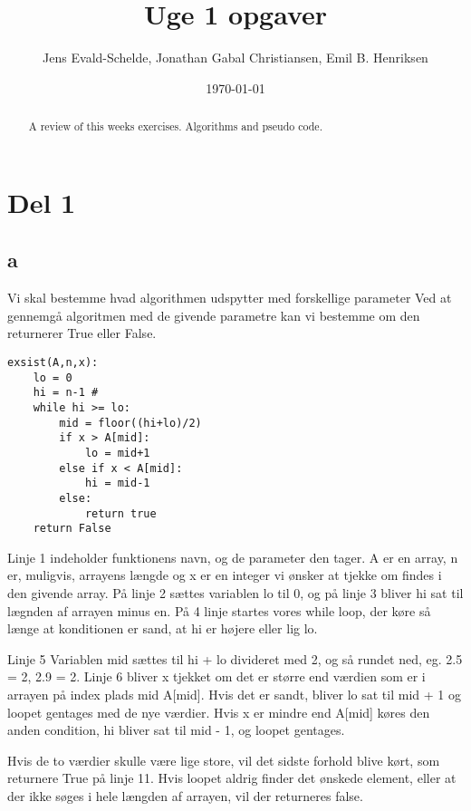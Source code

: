 \documentclass{report}
\begin{document}
\title{Uge 1 opgaver}
\author{Jens Evald-Schelde, Jonathan Gabal Christiansen, Emil B. Henriksen}
\date{\today}
\maketitle

\begin{abstract}
	A review of this weeks exercises. Algorithms and pseudo code.
\end{abstract}

\chapter{Del 1}
\section{a}
Vi skal bestemme hvad algorithmen udspytter med forskellige parameter\newline
Ved at gennemgå algoritmen med de givende parametre kan vi bestemme om den returnerer True eller False.

\lstset{language=Python,numbers=left,stepnumber=1}
\begin{lstlisting}[frame=single]
exsist(A,n,x):
	lo = 0 
	hi = n-1 # 
	while hi >= lo:
		mid = floor((hi+lo)/2)
		if x > A[mid]:  
			lo = mid+1
		else if x < A[mid]:
			hi = mid-1
		else:
			return true
	return False
\end{lstlisting}

Linje 1 indeholder funktionens navn, og de parameter den tager. A er en array, n er, muligvis, arrayens længde og x er en integer vi ønsker at tjekke om findes i den givende array. På linje 2 sættes variablen lo til 0, og på linje 3 bliver hi sat til lægnden af arrayen minus en. På 4 linje startes vores while loop, der køre så længe at konditionen er sand, at hi er højere eller lig lo.
\newline

Linje 5 Variablen mid sættes til hi + lo divideret med 2, og så rundet ned, eg. 2.5 = 2, 2.9 = 2. Linje 6 bliver x tjekket om det er større end værdien som er i arrayen på index plads mid A[mid]. Hvis det er sandt, bliver lo sat til mid + 1 og loopet gentages med de nye værdier. Hvis x er mindre end A[mid] køres den anden condition, hi bliver sat til mid - 1, og loopet gentages.

Hvis de to værdier skulle være lige store, vil det sidste forhold blive kørt, som returnere True på linje 11. Hvis loopet aldrig finder det ønskede element, eller at der ikke søges i hele længden af arrayen, vil der returneres false.
\newline
\end{document}
